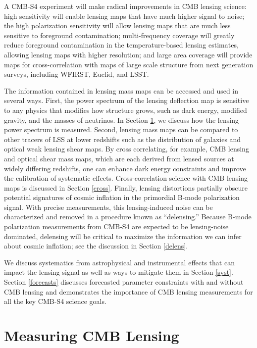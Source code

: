 A CMB-S4 experiment will make radical improvements in CMB lensing science:
high sensitivity will enable lensing maps that have much higher signal to
noise; the high polarization sensitivity will allow
lensing maps that are much less sensitive to foreground contamination;
multi-frequency coverage will greatly reduce foreground 
contamination in the temperature-based lensing estimates, 
allowing lensing maps with higher resolution; and
large area coverage will provide maps for cross-correlation with maps of large
scale structure from next generation surveys, including WFIRST, Euclid, and LSST.


The information contained in lensing mass maps can be accessed and used in several ways.
First, the power spectrum of the lensing deflection map is sensitive to any physics that modifies how structure grows, such as dark energy, modified gravity, and the masses of neutrinos.
In Section \ref{measuringLensing}, we discuss how the lensing power spectrum is measured.
Second, lensing mass maps can be compared to other tracers of LSS at lower redshifts such as the distribution of galaxies and optical weak lensing shear maps.  By cross correlating, for example, CMB lensing and optical shear mass maps, which are each derived from lensed sources at widely differing redshifts, one can enhance dark energy constraints and improve the calibration of systematic effects.
Cross-correlation science with CMB lensing maps is discussed in Section \ref{cross}.
Finally, lensing distortions partially obscure potential signatures of cosmic inflation in the primordial B-mode polarization signal.
With precise measurements, this lensing-induced noise can be characterized and removed in a procedure known as ``delensing.''
Because B-mode polarization measurements from CMB-S4 are expected to be lensing-noise dominated, delensing will be critical to maximize the information we can infer about cosmic inflation; see the discussion in Section \ref{delens}.

We discuss systematics from astrophysical and instrumental effects that can impact the lensing signal as well as ways to mitigate them in Section \ref{syst}.  Section \ref{forecasts} discusses forecasted parameter constraints with and without CMB lensing and demonstrates the importance of CMB lensing measurements for all the key CMB-S4 science goals.  


\section{Measuring CMB Lensing}\label{measuringLensing}

